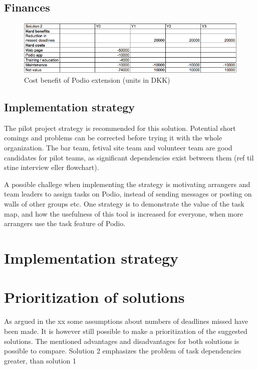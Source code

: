 \subsection{Finances}
\begin{figure}[h!]
  \centering
\includegraphics[scale=0.5]{Pictures/cost-benefit2.png}
    \caption{Cost benefit of Podio extension (units in DKK)}
\end{figure}

\subsection{Implementation strategy}
The pilot project strategy is recommended for this solution. Potential short comings and problems can be corrected before trying it with the whole organization. The bar team, fetival site team and volunteer team are good candidates for pilot teams, as significant dependencies exist between them (ref til stine interview eller flowchart).

A possible challege when implementing the strategy is motivating arrangers and team leaders to assign tasks on Podio, instead of sending messages or posting on walls of other groups etc. One strategy is to demonstrate the value of the task map, and how the usefulness of this tool is increased for everyone, when more arrangers use the task feature of Podio.

\section{Implementation strategy}

\section{Prioritization of solutions}
As argued in the xx some assumptions about numbers of deadlines missed have been made. It is however still possible to make a prioritization of the suggested solutions.
The mentioned advantages and disadvantages for both solutions is possible to compare. Solution 2 emphasizes the problem of task dependencies greater, than solution 1


